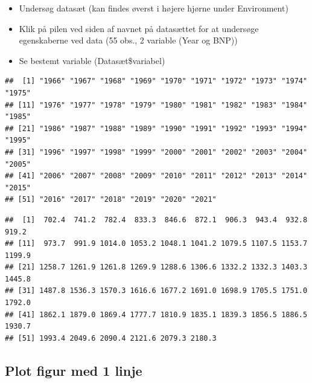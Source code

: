 \documentclass[
  12pt,
]{article}
\newenvironment{Shaded}{\begin{snugshade}}{\end{snugshade}}
\newcommand{\NormalTok}[1]{#1}
\newcommand{\SpecialCharTok}[1]{\textcolor[rgb]{0.00,0.00,0.00}{#1}}
\providecommand{\tightlist}{%
  \setlength{\itemsep}{0pt}\setlength{\parskip}{0pt}}
\begin{document}
\begin{itemize}
\tightlist
\item
  Undersøg datasæt (kan findes øverst i højere hjørne under Environment)
\item
  Klik på pilen ved siden af navnet på datasættet for at undersøge
  egenskaberne ved data (55 obs., 2 variable (Year og BNP))
\item
  Se bestemt variable (Datasæt\$variabel)
\end{itemize}

\begin{Shaded}
\end{Shaded}

\begin{verbatim}
##  [1] "1966" "1967" "1968" "1969" "1970" "1971" "1972" "1973" "1974" "1975"
## [11] "1976" "1977" "1978" "1979" "1980" "1981" "1982" "1983" "1984" "1985"
## [21] "1986" "1987" "1988" "1989" "1990" "1991" "1992" "1993" "1994" "1995"
## [31] "1996" "1997" "1998" "1999" "2000" "2001" "2002" "2003" "2004" "2005"
## [41] "2006" "2007" "2008" "2009" "2010" "2011" "2012" "2013" "2014" "2015"
## [51] "2016" "2017" "2018" "2019" "2020" "2021"
\end{verbatim}

\begin{Shaded}
\end{Shaded}

\begin{verbatim}
##  [1]  702.4  741.2  782.4  833.3  846.6  872.1  906.3  943.4  932.8  919.2
## [11]  973.7  991.9 1014.0 1053.2 1048.1 1041.2 1079.5 1107.5 1153.7 1199.9
## [21] 1258.7 1261.9 1261.8 1269.9 1288.6 1306.6 1332.2 1332.3 1403.3 1445.8
## [31] 1487.8 1536.3 1570.3 1616.6 1677.2 1691.0 1698.9 1705.5 1751.0 1792.0
## [41] 1862.1 1879.0 1869.4 1777.7 1810.9 1835.1 1839.3 1856.5 1886.5 1930.7
## [51] 1993.4 2049.6 2090.4 2121.6 2079.3 2180.3
\end{verbatim}

\hypertarget{plot-figur-med-1-linje}{%
\subsection{Plot figur med 1 linje}\label{plot-figur-med-1-linje}}
\end{document}
